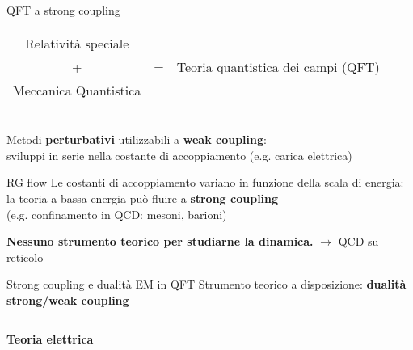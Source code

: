 \documentclass[10pt,compress,usenames,dvipsnames]{beamer}
\begin{document}
\begin{frame}{QFT a strong coupling}
\begin{tabular}{c l l }
Relatività speciale  & \\[0,1cm]
{\large+} & {\large=}  & \alert{ \large Teoria quantistica dei campi (QFT) }\\
Meccanica Quantistica & \\
\end{tabular}
\\
\vspace{0.3cm}
Metodi {\bfseries perturbativi} utilizzabili a \alert{\bfseries weak coupling}: \\
sviluppi in serie nella costante di accoppiamento (\small e.g.\alert { carica elettrica}) \\

\begin{block}{RG flow}
Le costanti di accoppiamento variano in funzione della scala di energia:	\\
la teoria a bassa energia può fluire a \alert{ \bfseries strong coupling} \\
(e.g. confinamento in QCD: mesoni, barioni)
\end{block}

\alert{\bfseries Nessuno strumento teorico per studiarne la dinamica.}
$\longrightarrow$ QCD su reticolo

\end{frame}


\begin{frame}{Strong coupling e dualità EM in QFT}
Strumento teorico a disposizione: \alert{\bfseries dualità strong/weak coupling}
\\[0,2cm]

\begin{columns}[c]
{\bfseries Teoria elettrica}





\end{columns}


\end{frame}
\end{document}
